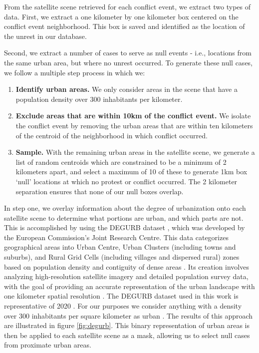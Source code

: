 From the satellite scene retrieved for each conflict event, we extract two types of data.  First, we extract a one kilometer by one kilometer box centered on the conflict event neighborhood.  This box is saved and identified as the location of the unrest in our database.

Second, we extract a number of cases to serve as null events - i.e., locations from the same urban area, but where no unrest occurred.  To generate these null cases, we follow a multiple step process in which we:

\begin{enumerate}[topsep=0pt,itemsep=-1ex,partopsep=0ex,parsep=0.5ex]
\item \textbf{Identify urban areas. } We only consider areas in the scene that have a population density over 300 inhabitants per kilometer.
\item \textbf{Exclude areas that are within 10km of the conflict event. } We isolate the conflict event by removing the urban areas that are within ten kilometers of the centroid of the neighborhood in which conflict occurred.
\item \textbf{Sample. } With the remaining urban areas in the satellite scene, we generate a list of random centroids which are constrained to be a minimum of 2 kilometers apart, and select a maximum of 10 of these to generate 1km box `null' locations at which no protest or conflict occurred.  The 2 kilometer separation ensures that none of our null boxes overlap.
\end{enumerate}


In step one, we overlay information about the degree of urbanization \citep{ghs_smod_2023, urbanisation_manual_2021} onto each satellite scene to determine what portions are urban, and which parts are not.  This is accomplished by using the DEGURB dataset \citep{ghs_smod_2023}, which was developed by the European Commission's Joint Research Centre.  This data categorizes geographical areas into Urban Centre, Urban Clusters (including towns and suburbs), and Rural Grid Cells (including villages and dispersed rural) zones based on population density and contiguity of dense areas \citep{urbanisation_manual_2021}.  Its creation involves analyzing high-resolution satellite imagery and detailed population survey data, with the goal of providing an accurate representation of the urban landscape with one kilometer spatial resolution \citep{urbanisation_manual_2021}. The DEGURB dataset used in this work is representative of 2020 \citep{ghs_smod_2023}.  For our purposes we consider anything with a density over 300 inhabitants per square kilometer as urban \citep{urbanisation_manual_2021}.   The results of this approach are illustrated in figure \ref{fig:degurb}.  This binary representation of urban areas is then be applied to each satellite scene as a mask, allowing us to select null cases from proximate urban areas.

